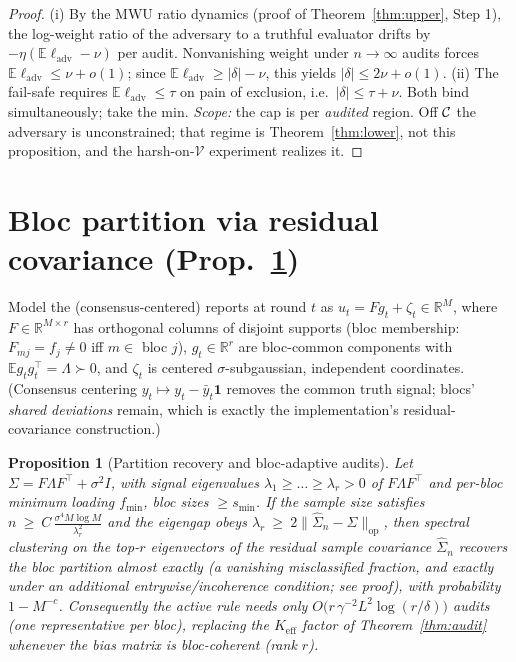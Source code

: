 \documentclass[11pt]{article}
\newtheorem{proposition}{Proposition}
\theoremstyle{definition}\newtheorem{definition}{Definition}
\theoremstyle{definition}\newtheorem{assumption}{Assumption}
\newcommand{\E}{\mathbb{E}}\newcommand{\Prob}{\mathbb{P}}
\newcommand{\V}{\mathcal{V}}\newcommand{\N}{\mathcal{N}}
\newcommand{\nfl}{\nu}                      %
\begin{document}
\begin{proof}
(i) By the MWU ratio dynamics (proof of Theorem~\ref{thm:upper}, Step 1), the
log-weight ratio of the adversary to a truthful evaluator drifts by
$-\eta(\E\ell_{\mathrm{adv}}-\nfl)$ per audit. Nonvanishing weight under
$n\to\infty$ audits forces $\E\ell_{\mathrm{adv}}\le\nfl+o(1)$; since
$\E\ell_{\mathrm{adv}}\ge|\delta|-\nfl$, this yields $|\delta|\le 2\nfl+o(1)$.
(ii) The fail-safe requires $\E\ell_{\mathrm{adv}}\le\tau$ on pain of exclusion,
i.e.\ $|\delta|\le\tau+\nfl$. Both bind simultaneously; take the min.
\emph{Scope:} the cap is per \emph{audited} region. Off $\mathcal{C}$ the adversary is
unconstrained; that regime is Theorem~\ref{thm:lower}, not this proposition, and
the harsh-on-$\V$ experiment realizes it.
\end{proof}

\section{Bloc partition via residual covariance (Prop.\ \texorpdfstring{\ref*{prop:bloc}}{6})}
\label{app:bloc}

Model the (consensus-centered) reports at round $t$ as
$u_t = F g_t + \zeta_t\in\mathbb{R}^{M}$, where $F\in\mathbb{R}^{M\times r}$ has
orthogonal columns of disjoint supports (bloc membership: $F_{m j}=f_j\neq 0$ iff
$m\in$ bloc $j$), $g_t\in\mathbb{R}^{r}$ are bloc-common components with
$\E g_tg_t^{\top}=\Lambda\succ 0$, and $\zeta_t$ is centered
$\sigma$-subgaussian, independent coordinates. (Consensus centering
$y_t\mapsto y_t-\bar y_t\mathbf 1$ removes the common truth signal; blocs'
\emph{shared deviations} remain, which is exactly the implementation's
residual-covariance construction.)

\begin{proposition}[Partition recovery and bloc-adaptive audits]\label{prop:bloc}
Let $\Sigma=F\Lambda F^{\top}+\sigma^2 I$, with signal eigenvalues
$\lambda_1\ge\dots\ge\lambda_r>0$ of $F\Lambda F^\top$ and per-bloc minimum
loading $f_{\min}$, bloc sizes $\ge s_{\min}$. If the sample size satisfies
$n\ \ge\ C\,\frac{\sigma^4 M\log M}{\lambda_r^{2}}$ and the eigengap obeys
$\lambda_r\ \ge\ 2\|\hat\Sigma_n-\Sigma\|_{\mathrm{op}}$, then spectral
clustering on the top-$r$ eigenvectors of the residual sample covariance
$\hat\Sigma_n$ recovers the bloc partition \emph{almost exactly} (a vanishing
misclassified fraction, and exactly under an additional entrywise/incoherence
condition; see proof), with probability $1-M^{-c}$. Consequently the active rule needs only
$O\!\big(r\,\gamma^{-2}L^2\log(r/\delta)\big)$ audits (one representative per
bloc), replacing the $K_{\mathrm{eff}}$ factor of Theorem~\ref{thm:audit}
whenever the bias matrix is bloc-coherent (rank $r$).
\end{proposition}
\end{document}
